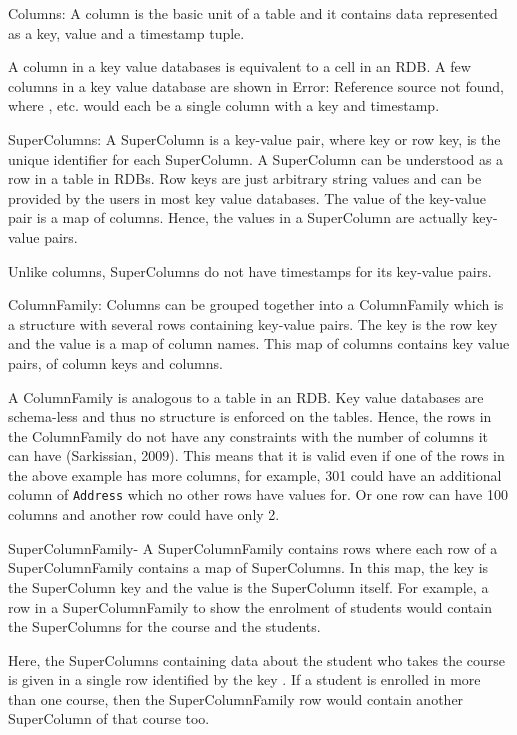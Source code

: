 Columns:  A column is the basic unit of a table and it contains data represented
as a key, value and a timestamp tuple.

A column in a key value databases is equivalent to a cell in an \ac{RDB}. A few
columns in a key value database are shown in Error: Reference source not found,
where ,  etc. would
each be a single column with a key and timestamp.

SuperColumns: A SuperColumn is a key-value pair, where key or row key, is the
unique identifier for each SuperColumn. A SuperColumn can be understood as a row
in a table in \acp{RDB}. Row keys are just arbitrary string values and can be
provided by the users in most key value databases. The value of the key-value
pair is a map of columns. Hence, the values in a SuperColumn are actually
key-value pairs.

Unlike columns, SuperColumns do not have timestamps for its key-value pairs.

ColumnFamily: Columns can be grouped together into a ColumnFamily which is a
structure with several rows containing key-value pairs. The key is the row key
and the value is a map of column names. This map of columns contains key value
pairs, of column keys and columns.

A ColumnFamily is analogous to a table in an \ac{RDB}. Key value databases are
schema-less and thus no structure is enforced on the tables. Hence, the rows in
the ColumnFamily do not have any constraints with the number of columns it can
have (Sarkissian, 2009). This means that it is valid even if one of the rows in
the above example has more columns, for example, 301 could have an additional
column of \texttt{Address} which no other rows have values for. Or one row can
have 100 columns and another row could have only 2.

SuperColumnFamily- A SuperColumnFamily contains rows where each row of a
SuperColumnFamily contains a map of SuperColumns. In this map, the key is the
SuperColumn key and the value is the SuperColumn itself. For example, a row in a
SuperColumnFamily to show the enrolment of students would contain the
SuperColumns for the course and the students.

Here, the SuperColumns containing data about the student  who takes
the course  is given in a single row identified by
the key . If a student is enrolled in more than one course, then the
SuperColumnFamily row would contain another SuperColumn of that course too.

